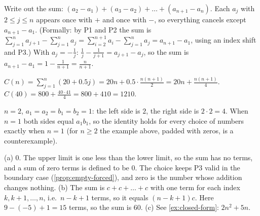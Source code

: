 Write out the sum: $(a_2-a_1)+(a_3-a_2)+\dots+(a_{n+1}-a_n)$. Each $a_j$ with $2\le j\le n$ appears once with $+$ and
once with $-$, so everything cancels except $a_{n+1}-a_1$. (Formally: by P1 and P2 the sum is
$\sum_{j=1}^n a_{j+1}-\sum_{j=1}^n a_j=\sum_{i=2}^{n+1}a_i-\sum_{j=1}^n a_j=a_{n+1}-a_1$, using an index shift and
P3.) With $a_j=-\frac1j$: $\frac1j-\frac1{j+1}=a_{j+1}-a_j$, so the sum is $a_{n+1}-a_1=1-\frac1{n+1}=\frac{n}{n+1}$.

$C(n)=\sum_{j=1}^{n}(20+0.5j)=20n+0.5\cdot\frac{n(n+1)}2=20n+\frac{n(n+1)}{4}$.
$C(40)=800+\frac{40\cdot41}{4}=800+410=1210$.

$n=2$, $a_1=a_2=b_1=b_2=1$: the left side is $2$, the right side is $2\cdot2=4$. When $n=1$ both sides equal $a_1b_1$, so
the identity holds for every choice of numbers exactly when $n=1$ (for $n\ge2$ the example above, padded with zeros,
is a counterexample).

(a) $0$. The upper limit is one less than the lower limit, so the sum has no terms, and a sum of zero terms is
defined to be $0$. The choice keeps P3 valid in the boundary case (\cref{prop:empty-forced}), and zero is the
number whose addition changes nothing.
(b) The sum is $c+c+\dots+c$ with one term for each index $k,k+1,\dots,n$, i.e.\ $n-k+1$ terms, so it equals $(n-k+1)c$.
Here $9-(-5)+1=15$ terms, so the sum is $60$.
(c) See \cref{ex:closed-form}: $2n^2+5n$.
